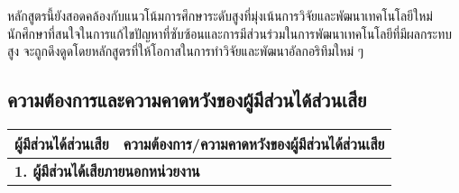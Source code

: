 หลักสูตรนี้ยังสอดคล้องกับแนวโน้มการศึกษาระดับสูงที่มุ่งเน้นการวิจัยและพัฒนาเทคโนโลยีใหม่ นักศึกษาที่สนใจในการแก้ไขปัญหาที่ซับซ้อนและการมีส่วนร่วมในการพัฒนาเทคโนโลยีที่มีผลกระทบสูง จะถูกดึงดูดโดยหลักสูตรที่ให้โอกาสในการทำวิจัยและพัฒนาอัลกอริทึมใหม่ ๆ


\clearpage
\subsection{ความต้องการและความคาดหวังของผู้มีส่วนได้ส่วนเสีย}

\begin{longtable}{|p{} | p{}|}
\hline
\textbf{ผู้มีส่วนได้ส่วนเสีย} & \textbf{ความต้องการ/ความคาดหวังของผู้มีส่วนได้ส่วนเสีย} \\ \hline
\endhead

\multicolumn{2}{|l|}{\textbf{1. ผู้มีส่วนได้เสียภายนอกหน่วยงาน}} \\ \hline


\end{longtable}
